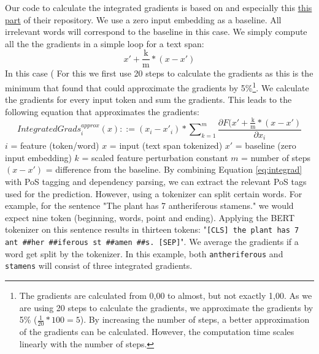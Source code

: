\documentclass[a4paper, 12pt, oneside]{book} %
\begin{document}
Our code to calculate the integrated gradients is based on \textcite{gardner_allennlp_2017} and especially this  \href{https://github.com/allenai/allennlp/tree/master/allennlp/interpret}{this part} of their repository.
We use a zero input embedding as a baseline.
All irrelevant words will correspond to the baseline in this case.
We simply compute all the the gradients in a simple loop for a text span:
\begin{equation}
    x' +  \frac{\mathrm{k}}{\mathrm{m}} * (x - x')
\end{equation}
In this case (
For this we first use 20 steps to calculate the gradients as this is the minimum that \textcite{sundararajan_axiomatic_2017} found that could approximate the gradients by 5\%\footnote{The gradients are calculated from 0,00 to almost, but not exactly 1,00. As we are using 20 steps to calculate the gradients, we approximate the gradients by 5\% (\(\frac{1}{20} * 100 = 5\)). By increasing the number of steps, a better approximation of the gradients can be calculated. However, the computation time scales linearly with the number of steps.}.
We calculate the gradients for every input token and sum the gradients.
This leads to the following equation that approximates the gradients:
\begin{equation} \label{eq:integrad}
    {IntegratedGrads_i^{approx}} (x) ::= (x_i - x'_i) *  \sum\nolimits_{k=1}^{m}  \frac{\partial F(x' +  \frac{\mathrm{k}}{\mathrm{m}} * (x - x') }{\partial x_i} 
\end{equation}
\(i\) = feature (token/word)\newline
\(x\) = input (text span tokenized)\newline
\(x'\) = baseline (zero input embedding)\newline
\(k\) = scaled feature perturbation constant\newline
\(m\) = number of steps\newline
\((x - x')\) = difference from the baseline. \newline
\newline
By combining Equation \ref{eq:integrad} with PoS tagging and dependency parsing, we can extract the relevant PoS tags used for the prediction.
However, using a tokenizer can split certain words.
For example, for the sentence "The plant has 7 antheriferous stamens." we would expect nine token (beginning, words, point and ending).
Applying the BERT tokenizer on this sentence results in thirteen tokens:
"\verb|[CLS] the plant has 7 ant ##her ##iferous st ##amen ##s. [SEP]|".
We average the gradients if a word get split by the tokenizer.
In this example, both \verb|antheriferous| and \verb|stamens| will consist of three integrated gradients. 
\end{document}
